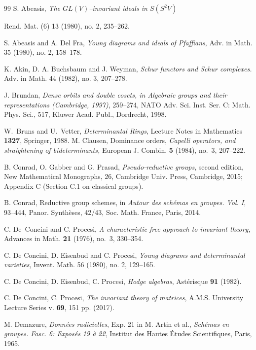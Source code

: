 \documentclass[10pt]{amsart}
\theoremstyle{definition}
\theoremstyle{remark}
\begin{document}
\begin{thebibliography}{99}
S. Abeasis, \emph{The  $GL(V)$--invariant ideals in  $S(S^2V) $}

Rend. Mat. (6) 13 (1980), no. 2, 235--262.

 S. Abeasis and A. Del Fra, \emph{Young diagrams and ideals of Pfaffians},
Adv. in Math. 35 (1980), no. 2, 158--178.

K. Akin, D. A. Buchsbaum and J. Weyman,
{\it Schur functors and Schur complexes.}  Adv. in Math. 44 (1982), no. 3, 207--278.




J. Brundan, \emph{Dense orbits and double cosets, in {\it Algebraic groups and their representations} (Cambridge, 1997)}, 259--274, NATO Adv. Sci. Inst. Ser. C: Math. Phys. Sci., 517, Kluwer Acad. Publ., Dordrecht, 1998.

W.~Bruns and U.~Vetter, \emph{Determinantal Rings},
Lecture Notes in Mathematics \textbf{1327}, Springer, 1988.
M. Clausen, Dominance orders,  \emph{Capelli operators, and straightening of bideterminants,} European J. Combin. {\bf 5} (1984), no.~3, 207--222.



 B. Conrad, O. Gabber and G. Prasad, {\it Pseudo-reductive groups}, second edition, 
New Mathematical Monographs, 26, Cambridge Univ. Press, Cambridge, 2015; Appendix C (Section C.1 on classical groups).

B. Conrad, Reductive group schemes, in {\it Autour des sch\'emas en groupes. Vol. I}, 93--444, Panor. Synth\`eses, 42/43, Soc. Math. France, Paris, 2014.

 C. De~Concini and C. Procesi, \emph{A characteristic free approach to invariant theory,} Advances in Math. {\bf 21} (1976), no.~3, 330--354.


 C. De Concini, D. Eisenbud and C. Procesi, \emph{Young diagrams and determinantal varieties},
Invent. Math. 56 (1980), no. 2, 129--165.

 C. De Concini, D. Eisenbud, C. Procesi, \emph{Hodge algebras}, Ast\'erisque \textbf{91} (1982).


  C. De Concini,   C. Procesi, \textit{The invariant theory of matrices}, A.M.S. University Lecture Series v. \textbf{69}, 151 pp. (2017).

 M. Demazure, \emph{Donn\'ees radicielles}, Exp. 21  in M. Artin et al., {\it Sch\'emas en groupes. Fasc. 6: Expos\'es 19 \`a{} 22}, Institut des Hautes \'Etudes Scientifiques, Paris, 1965.



\end{thebibliography}
\end{document}
